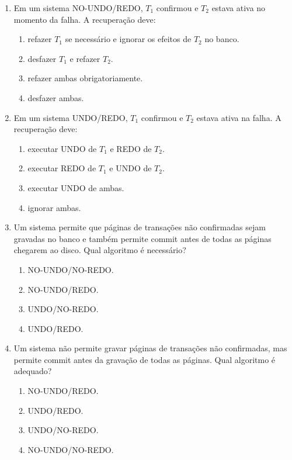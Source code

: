 \documentclass[12pt,a4paper]{article}
\begin{document}
\begin{enumerate}[resume,label=\textbf{Q\arabic*.}]
\item Em um sistema NO-UNDO/REDO, $T_1$ confirmou e $T_2$ estava ativa no momento da falha. A recuperação deve:

\begin{enumerate}[label=\alph*)]
    \item refazer $T_1$ se necessário e ignorar os efeitos de $T_2$ no banco.
    \item desfazer $T_1$ e refazer $T_2$.
    \item refazer ambas obrigatoriamente.
    \item desfazer ambas.
\end{enumerate}

\item Em um sistema UNDO/REDO, $T_1$ confirmou e $T_2$ estava ativa na falha. A recuperação deve:

\begin{enumerate}[label=\alph*)]
    \item executar UNDO de $T_1$ e REDO de $T_2$.
    \item executar REDO de $T_1$ e UNDO de $T_2$.
    \item executar UNDO de ambas.
    \item ignorar ambas.
\end{enumerate}

\item Um sistema permite que páginas de transações não confirmadas sejam gravadas no banco e também permite commit antes de todas as páginas chegarem ao disco. Qual algoritmo é necessário?

\begin{enumerate}[label=\alph*)]
    \item NO-UNDO/NO-REDO.
    \item NO-UNDO/REDO.
    \item UNDO/NO-REDO.
    \item UNDO/REDO.
\end{enumerate}

\item Um sistema não permite gravar páginas de transações não confirmadas, mas permite commit antes da gravação de todas as páginas. Qual algoritmo é adequado?

\begin{enumerate}[label=\alph*)]
    \item NO-UNDO/REDO.
    \item UNDO/REDO.
    \item UNDO/NO-REDO.
    \item NO-UNDO/NO-REDO.
\end{enumerate}


\end{enumerate}
\end{document}
